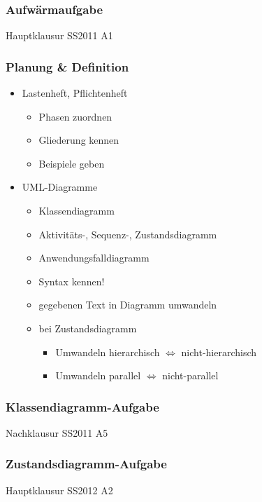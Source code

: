 \documentclass[18pt]{beamer}
\begin{document}
	\begin{frame}
		\frametitle{Aufwärmaufgabe}
		\begin{huge}
			\centering Hauptklausur SS2011 A1
		\end{huge}
	\end{frame}

	\begin{frame}
		\frametitle{Planung \& Definition}
		\begin{itemize}
			\item Lastenheft, Pflichtenheft \pause
			\begin{itemize}
				\item Phasen zuordnen \pause
				\item Gliederung kennen \pause
				\item Beispiele geben \pause
			\end{itemize}
			\item UML-Diagramme \pause
			\begin{itemize}
				\item Klassendiagramm \pause
				\item Aktivitäts-, Sequenz-, Zustandsdiagramm \pause 
				\item Anwendungsfalldiagramm \pause
				\item Syntax kennen! \pause
				\item gegebenen Text in Diagramm umwandeln \pause
				\item bei Zustandsdiagramm
				\begin{itemize}
					\item Umwandeln hierarchisch $\Leftrightarrow$ nicht-hierarchisch 
					\item Umwandeln parallel $\Leftrightarrow$ nicht-parallel
				\end{itemize}
			\end{itemize}
		\end{itemize}
	\end{frame}

	\begin{frame}
		\frametitle{Klassendiagramm-Aufgabe}
		\begin{huge}
				\centering Nachklausur SS2011 A5
		\end{huge}
	\end{frame}

	\begin{frame}
		\frametitle{Zustandsdiagramm-Aufgabe}
		\begin{huge}
			 	\centering Hauptklausur SS2012 A2
		\end{huge}
	\end{frame}
\end{document}
